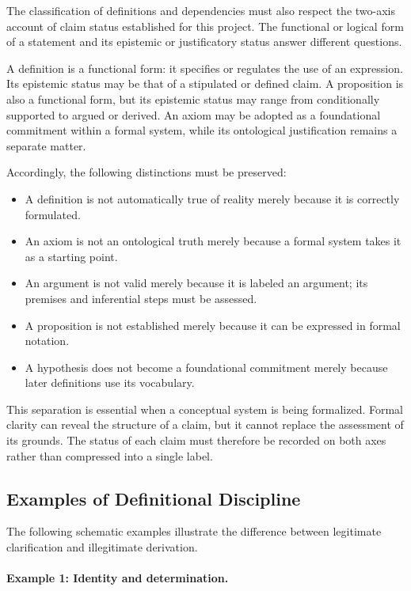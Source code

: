 The classification of definitions and dependencies must also
respect the two-axis account of claim status established for
this project. The functional or logical form of a statement and
its epistemic or justificatory status answer different questions.

A definition is a functional form: it specifies or regulates the
use of an expression. Its epistemic status may be that of a
stipulated or defined claim. A proposition is also a functional
form, but its epistemic status may range from conditionally
supported to argued or derived. An axiom may be adopted as a
foundational commitment within a formal system, while its
ontological justification remains a separate matter.

Accordingly, the following distinctions must be preserved:

\begin{itemize}
  \item A definition is not automatically true of reality merely
  because it is correctly formulated.
  \item An axiom is not an ontological truth merely because a
  formal system takes it as a starting point.
  \item An argument is not valid merely because it is labeled
  an argument; its premises and inferential steps must be assessed.
  \item A proposition is not established merely because it can
  be expressed in formal notation.
  \item A hypothesis does not become a foundational commitment
  merely because later definitions use its vocabulary.
\end{itemize}

This separation is essential when a conceptual system is being
formalized. Formal clarity can reveal the structure of a claim,
but it cannot replace the assessment of its grounds. The status
of each claim must therefore be recorded on both axes rather
than compressed into a single label.

\subsection{Examples of Definitional Discipline}

The following schematic examples illustrate the difference
between legitimate clarification and illegitimate derivation.

\paragraph{Example 1: Identity and determination.}

